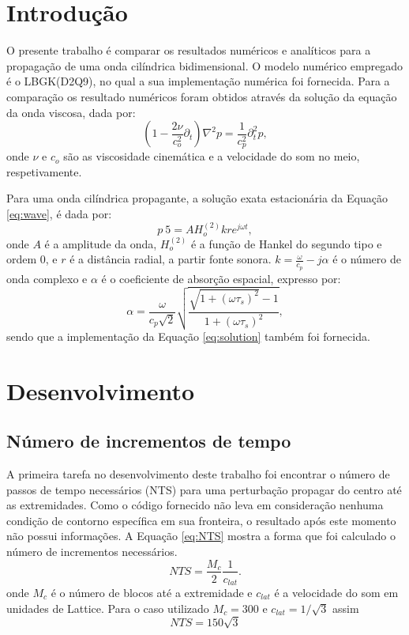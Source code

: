 \chapter{Introdução}
\label{sec:introd}
O presente trabalho é comparar os resultados numéricos e analíticos para a propagação de uma onda cilíndrica bidimensional. O modelo numérico empregado é o LBGK(D2Q9), no qual a sua implementação numérica foi fornecida. Para a comparação os resultado numéricos foram obtidos através da solução da equação da onda viscosa, dada por:
\begin{equation}
\left( 1-\frac{2\nu}{c_{o}^2}\partial_{t}\right)\nabla^2p=\frac{1}{c_{p}^2}\partial_{t}^2 p,
\label{eq:wave}
\end{equation}
onde $\nu$ e $c_o$ são as viscosidade cinemática e a velocidade do som no meio, respetivamente.

 Para uma onda cilíndrica propagante, a solução exata estacionária da Equação \ref{eq:wave}, é dada por:
\begin{equation}
p~5=AH_{o}^{(2)}kr e^{j \omega t},
\label{eq:solution}
\end{equation}
onde $A$ é a amplitude da onda, $H_{o}^{(2)}$ é a função de Hankel do segundo tipo e ordem 0, e $r$ é a distância radial, a partir fonte sonora. $k=\frac{\omega}{c_p}-j\alpha$ é o número de onda complexo e $\alpha$ é o coeficiente de absorção espacial, expresso por:
\begin{equation}
\alpha=\frac{\omega}{c_p \sqrt{2}}\sqrt{\frac{\sqrt{1+(\omega \tau_{s})^2}-1}{1+(\omega \tau_{s})^2}},
\label{eq:alpha}
\end{equation}
sendo que a implementação da Equação \ref{eq:solution} também foi fornecida.

\chapter{Desenvolvimento}
\label{sec:des}

\section{Número de incrementos de tempo}
\label{sec:B1}

A primeira tarefa no desenvolvimento deste trabalho foi encontrar o número de passos de tempo necessários (NTS) para uma perturbação propagar do centro até as extremidades. Como o código fornecido não leva em consideração nenhuma condição de contorno específica em sua fronteira, o resultado após este momento não possui informações. A Equação \ref{eq:NTS} mostra a forma que foi calculado o número de incrementos necessários. 
\begin{equation}
NTS = \frac{M_c}{2} \frac{1}{c_{lat}}.
\label{eq:NTS}
\end{equation} 
onde $M_c$ é o número de blocos até a extremidade e $c_{lat}$ é a velocidade do som em unidades de Lattice. Para o caso utilizado $M_c = 300$ e $c_{lat} = 1/\sqrt{3}$ assim
\begin{equation*}
NTS = 150\sqrt{3}
\label{eq:NTS}
\end{equation*} 

